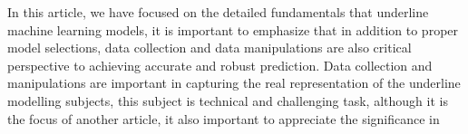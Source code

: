 
\par
In this article, we have focused on the detailed fundamentals that underline machine learning models, it is important to emphasize that in addition to proper model selections, data collection and data manipulations are also critical perspective to achieving accurate and robust prediction. Data collection and manipulations are important in capturing the real representation of the underline modelling subjects, this subject is  technical and challenging task, although it is the focus of another article, it also important to appreciate the significance in 
\par 
